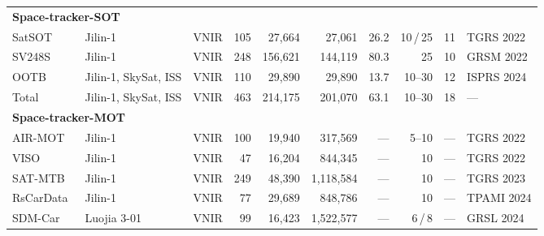 \begin{table}[t]
{\begin{tabular}{l l l r r r r r r l}
\midrule
\multicolumn{10}{l}{\textbf{Space-tracker-SOT}} \\
SatSOT~\cite{satSOT2022}              & Jilin-1                      & VNIR & 105 &  27{,}664 &      27{,}061 & 26.2 &  10\,/\,25 & 11 & TGRS 2022  \\
SV248S~\cite{Li2022SV248S}            & Jilin-1                      & VNIR & 248 & 156{,}621 &     144{,}119 & 80.3 &  25 & 10 & GRSM 2022  \\
OOTB~\cite{CHEN2024212ootb}           & Jilin-1, SkySat, ISS         & VNIR & 110 &  29{,}890 &      29{,}890 & 13.7 &  10--30 & 12 & ISPRS 2024 \\
Total     & Jilin-1, SkySat, ISS         & VNIR & 463 & 214{,}175 &     201{,}070 & 63.1 &  10--30 & 18 & --- \\
\midrule
\multicolumn{10}{l}{\textbf{Space-tracker-MOT}} \\
AIR-MOT~\cite{He2022TGraM}            & Jilin-1                      & VNIR & 100 &  19{,}940 &     317{,}569 & --- & 5--10 & --- & TGRS 2022  \\
VISO~\cite{yin2021viso}               & Jilin-1                      & VNIR &  47 &  16{,}204 &     844{,}345 & --- & 10 & --- & TGRS 2022  \\
SAT-MTB~\cite{Li2023SATMTB}           & Jilin-1                      & VNIR & 249 &  48{,}390 &  1{,}118{,}584 & --- & 10 & --- & TGRS 2023  \\
RsCarData~\cite{Xiao2024HiEUM}        & Jilin-1                      & VNIR &  77 &  29{,}689 &     848{,}786 & --- & 10 & --- & TPAMI 2024 \\
SDM-Car~\cite{Zhang2024SDMCar}        & Luojia 3-01                  & VNIR &  99 &  16{,}423 &  1{,}522{,}577 & --- &  6\,/\,8 & --- & GRSL 2024  \\
\bottomrule
\end{tabular}%
}
\end{table}
